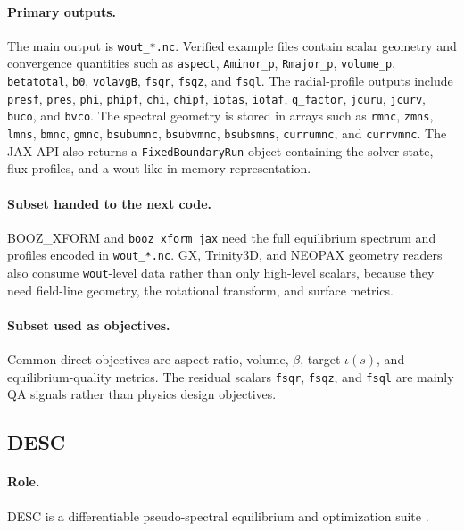 \documentclass[11pt]{article}
\newcommand{\code}[1]{\texttt{#1}}
\begin{document}
\paragraph{Primary outputs.}
The main output is \code{wout\_*.nc}. Verified example files contain scalar
geometry and convergence quantities such as \code{aspect}, \code{Aminor\_p},
\code{Rmajor\_p}, \code{volume\_p}, \code{betatotal}, \code{b0},
\code{volavgB}, \code{fsqr}, \code{fsqz}, and \code{fsql}. The radial-profile
outputs include \code{presf}, \code{pres}, \code{phi}, \code{phipf},
\code{chi}, \code{chipf}, \code{iotas}, \code{iotaf}, \code{q\_factor},
\code{jcuru}, \code{jcurv}, \code{buco}, and \code{bvco}. The spectral
geometry is stored in arrays such as \code{rmnc}, \code{zmns}, \code{lmns},
\code{bmnc}, \code{gmnc}, \code{bsubumnc}, \code{bsubvmnc},
\code{bsubsmns}, \code{currumnc}, and \code{currvmnc}. The JAX API also
returns a \code{FixedBoundaryRun} object containing the solver state, flux
profiles, and a wout-like in-memory representation.

\paragraph{Subset handed to the next code.}
BOOZ\_XFORM and \code{booz\_xform\_jax} need the full equilibrium spectrum and
profiles encoded in \code{wout\_*.nc}. GX, Trinity3D, and NEOPAX geometry
readers also consume \code{wout}-level data rather than only high-level
scalars, because they need field-line geometry, the rotational transform, and
surface metrics.

\paragraph{Subset used as objectives.}
Common direct objectives are aspect ratio, volume, \(\beta\), target
\(\iota(s)\), and equilibrium-quality metrics. The residual scalars
\code{fsqr}, \code{fsqz}, and \code{fsql} are mainly QA signals rather than
physics design objectives.

\subsection{DESC}

\paragraph{Role.}
DESC is a differentiable pseudo-spectral equilibrium and optimization suite
\citep{DudtKolemen2020,Panici2023,Conlin2023,Dudt2023QS,DESCRepo}.
\end{document}
